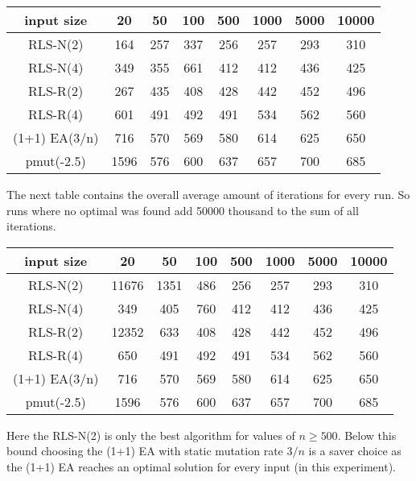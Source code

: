 \begin{tabular}{cccccccc}
      input size    & 20   & 50  & 100 & 500 & 1000 & 5000 & 10000 \\\hline
      RLS-N(2)      & 164  & 257 & 337 & 256 & 257  & 293  & 310   \\
      RLS-N(4)      & 349  & 355 & 661 & 412 & 412  & 436  & 425   \\
      RLS-R(2)      & 267  & 435 & 408 & 428 & 442  & 452  & 496   \\
      RLS-R(4)      & 601  & 491 & 492 & 491 & 534  & 562  & 560   \\
      (1+1) EA(3/n) & 716  & 570 & 569 & 580 & 614  & 625  & 650   \\
      pmut(-2.5)    & 1596 & 576 & 600 & 637 & 657  & 700  & 685   \\
\end{tabular}

The next table contains the overall average amount of iterations for every run.
So runs where no optimal was found add 50000 thousand to the sum of all iterations.

\begin{tabular}{cccccccc}
      input size    & 20    & 50   & 100 & 500 & 1000 & 5000 & 10000 \\\hline
      RLS-N(2)      & 11676 & 1351 & 486 & 256 & 257  & 293  & 310   \\
      RLS-N(4)      & 349   & 405  & 760 & 412 & 412  & 436  & 425   \\
      RLS-R(2)      & 12352 & 633  & 408 & 428 & 442  & 452  & 496   \\
      RLS-R(4)      & 650   & 491  & 492 & 491 & 534  & 562  & 560   \\
      (1+1) EA(3/n) & 716   & 570  & 569 & 580 & 614  & 625  & 650   \\
      pmut(-2.5)    & 1596  & 576  & 600 & 637 & 657  & 700  & 685   \\
\end{tabular}

Here the RLS-N(2) is only the best algorithm for values of $n \ge 500$.
Below this bound choosing the (1+1) EA with static mutation rate $3/n$ is a saver choice as the (1+1) EA reaches an optimal solution for every input (in this experiment).
